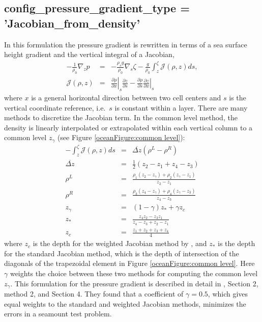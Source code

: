 \subsection{ config\_pressure\_gradient\_type = 'Jacobian\_from\_density'}
In this formulation the pressure gradient is rewritten in terms of a sea surface height gradient and the vertical integral of a Jacobian,
\begin{eqnarray}
\label{ocean:grad p Jacobian}
- \frac{1}{\rho_0}\nabla_z p &=& - \frac{\rho_s g}{\rho_0}\nabla_s \zeta - \frac{g}{\rho_0}\int_z^\zeta {\mathcal J}(\rho,z)ds, \\
{\mathcal J}(\rho,z) &=& \left. \frac{\partial \rho}{\partial x} \right|_s \frac{\partial z}{\partial s} 
 - \frac{\partial \rho}{\partial s}  \left. \frac{\partial z}{\partial x} \right|_s 
\end{eqnarray}
where $x$ is a general horizontal direction between two cell centers and $s$ is the vertical coordinate reference, i.e.\ $s$ is constant within a layer.  There are many methods to discretize the Jacobian term.  In the common level method, the density is linearly interpolated or extrapolated within each vertical column to a common level $z_\gamma$ (see Figure \ref{oceanFigure:common level}):
\begin{eqnarray}
- \int_z^\zeta {\mathcal J}(\rho,z)ds &=& \overline{\Delta z} \left( \rho^L - \rho^R \right) \\
\overline{\Delta z} &=& \frac{1}{2} \left(z_2-z_1 + z_4-z_3\right) \\
\rho^L &=& \frac{\rho_1\left(z_2-z_\gamma\right) + \rho_2\left(z_\gamma-z_1\right) }{z_2-z_1}\\
\rho^R &=& \frac{\rho_3\left(z_4-z_\gamma\right) + \rho_4\left(z_\gamma-z_3\right) }{z_4-z_3}\\
z_\gamma &=& \left(1-\gamma\right)z_* + \gamma z_c \\
z_* &=&  \frac{z_4 z_2-z_3z_1}{z_4-z_3 + z_2-z_1} \\
z_c &=&  \frac{z_1+z_2+z_3+z_4}{4} 
\end{eqnarray}
where $z_c$ is the depth for the weighted Jacobian method by \citet{Song98mwr}, and $z_*$ is the depth for the standard Jacobian method, which is the depth of intersection of the diagonals of the trapezoidal element in Figure \ref{oceanFigure:common level}.  Here $\gamma$ weights the choice between these two methods for computing the common level $z_\gamma$.  This formulation for the pressure gradient is described in detail in \citet{Shchepetkin_McWilliams03jgr}, Section 2, method 2, and Section 4.  They found that a coefficient of $\gamma=0.5$, which gives equal weights to the standard and weighted Jacobian methods, minimizes the errors in a seamount test problem.

